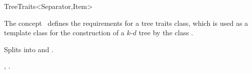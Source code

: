 

\begin{ccRefConcept}{TreeTraits<Separator,Item>}

\ccDefinition
  
The concept \ccRefName\ defines the requirements for a tree traits class, which is used as
a template class for the construction of a $k$-$d$  tree by the class .

\ccCreation
{}  %



{Splits  into  and .}
 
\ccHasModels


\ccSeeAlso

,
.

\end{ccRefConcept}



